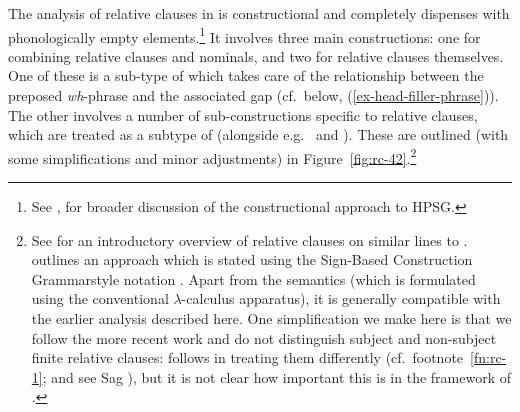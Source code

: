 \documentclass[output=paper,biblatex,babelshorthands,newtxmath,draftmode,colorlinks,citecolor=brown]{langscibook}
\begin{document}
The analysis of  relative clauses in  is constructional and completely
dispenses with phonologically empty elements.\footnote{See , for
    broader discussion of the constructional approach to HPSG.} It involves three main constructions: one
for combining relative clauses and nominals, and two for relative clauses themselves. One of these
is a sub-type of  which takes care of the relationship between the preposed \emph{wh}-phrase
and the associated gap (cf.\ below, (\ref{ex-head-filler-phrase})). The other involves a
number of sub-constructions specific to relative clauses, which are treated as a subtype
of  (alongside e.g.\  and ). These
are outlined (with some simplifications and minor adjustments) in
Figure~\ref{fig:rc-42}.\footnote{See  for an introductory
  overview of  relative clauses on similar lines to
  . \citet[521--524]{Sag:10b} outlines an approach which is stated using the
  Sign-Based Construction Grammar\indexsbcg style notation \citep{BS2012a-ed}. Apart from the
  semantics (which is formulated using the conventional $\lambda$-calculus apparatus), it is
  generally compatible with the earlier analysis described here.  One simplification we
  make here is that we follow the more recent work \citep[e.g.][523]{Sag:10b} and do not
  distinguish subject and non-subject finite relative clauses: \citet{Sag:97} follows
  \citet[Chapter~5]{Pollard:Sag:94} in treating them differently (cf.\ footnote~\ref{fn:rc-1}; and see
  Sag \citeyear[452--454]{Sag:97}), but it is not clear how important this is in the
  framework of \citet{Sag:97}.}

\newsavebox{\RelcHierarchyDA}
\end{document}
